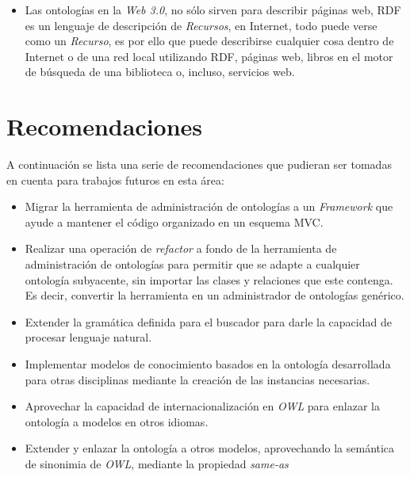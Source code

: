 \begin{itemize}
    \item Las ontologías en la \textit{Web 3.0}, no sólo sirven para describir páginas web, RDF es un lenguaje de descripción de \textit{Recursos}, en Internet, todo puede verse como un \textit{Recurso}, es por ello que puede describirse cualquier cosa dentro de Internet o de una red local utilizando RDF, páginas web, libros en el motor de búsqueda de una biblioteca o, incluso, servicios web.
\end{itemize}

\section{Recomendaciones}
A continuación se lista una serie de recomendaciones que pudieran ser tomadas en cuenta para trabajos futuros en esta área:

\begin{itemize}
    \item Migrar la herramienta de administración de ontologías a un \textit{Framework} que ayude a mantener el código organizado en un esquema MVC.
    \item Realizar una operación de \textit{refactor} a fondo de la herramienta de administración de ontologías para permitir que se adapte a cualquier ontología subyacente, sin importar las clases y relaciones que este contenga. Es decir, convertir la herramienta en un administrador de ontologías genérico.
    \item Extender la gramática definida para el buscador para darle la capacidad de procesar lenguaje natural.
    \item Implementar modelos de conocimiento basados en la ontología desarrollada para otras disciplinas mediante la creación de las instancias necesarias.
    \item Aprovechar la capacidad de internacionalización en \textit{OWL} para enlazar la ontología a modelos en otros idiomas.
    \item Extender y enlazar la ontología a otros modelos, aprovechando la semántica de sinonimia de \textit{OWL}, mediante la propiedad \textit{same-as}
\end{itemize}
